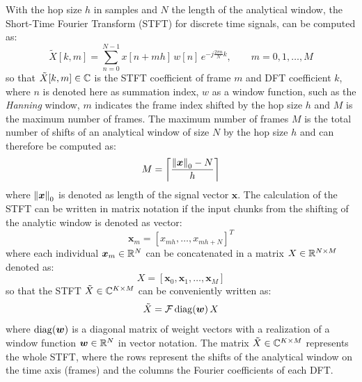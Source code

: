 With the hop size $h$ in samples and $N$ the length of the analytical window, the Short-Time Fourier Transform (STFT) for discrete time signals, can be computed as:
\begin{equation}\label{eq:signal_spec_stft}
    \tilde{X}[k, m] = \sum_{n=0}^{N-1} x[n + m h] \, w[n] \, e^{-j\frac{2 \pi n}{N}k}, \qquad m = 0, 1, \dots, M
\end{equation}
so that $\tilde{X}[k, m] \in \C$ is the STFT coefficient of frame $m$ and DFT coefficient $k$, where $n$ is denoted here as summation index, $w$ as a window function, such as the \emph{Hanning} window, $m$ indicates the frame index shifted by the hop size $h$ and $M$ is the maximum number of frames.
The maximum number of frames $M$ is the total number of shifts of an analytical window of size $N$ by the hop size $h$ and can therefore be computed as:
\begin{equation}\label{eq:signal_spec_hop}
  M = \ceil*{\frac{\norm{\bm{x}}_0-N}{h}}
\end{equation}
where $\norm{\bm{x}}_0$ is denoted as length of the signal vector $\bm{x}$.
The calculation of the STFT can be written in matrix notation if the input chunks from the shifting of the analytic window is denoted as vector:
\begin{equation}
  \bm{x}_m = [x_{m h}, \dots, x_{m h+N}]^T
\end{equation}
where each individual $\bm{x}_m \in \R^N$ can be concatenated in a matrix $X \in \R^{N \times M}$ denoted as:
\begin{equation}
  X = [\bm{x}_0, \bm{x}_1, \dots, \bm{x}_M]
\end{equation}
so that the STFT $\tilde{X} \in \C^{K \times M}$ can be conveniently written as:
\begin{equation}\label{eq:signal_spec_stft_matrix}
  \tilde{X} = \mathcal{F} \diag{\bm{w}} X
\end{equation}
where $\diag{\bm{w}}$ is a diagonal matrix of weight vectors with a realization of a window function $\bm{w} \in \R^N$ in vector notation.
The matrix $\tilde{X} \in \C^{K \times M}$ represents the whole STFT, where the rows represent the shifts of the analytical window on the time axis (frames) and the columns the Fourier coefficients of each DFT.
